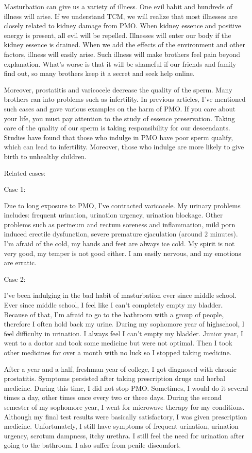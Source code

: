 \documentclass[
]{book}
\begin{document}
Masturbation can give us a variety of illness. One evil habit and hundreds of illness will arise. If we understand TCM, we will realize that most illnesses are closely related to kidney damage from PMO. When kidney essence and positive energy is present, all evil will be repelled. Illnesses will enter our body if the kidney essence is drained. When we add the effects of the environment and other factors, illness will easily arise. Such illness will make brothers feel pain beyond explanation. What's worse is that it will be shameful if our friends and family find out, so many brothers keep it a secret and seek help online.

Moreover, prostatitis and varicocele decrease the quality of the sperm. Many brothers ran into problems such as infertility. In previous articles, I've mentioned such cases and gave various examples on the harm of PMO. If you care about your life, you must pay attention to the study of essence preservation. Taking care of the quality of our sperm is taking responsibility for our descendants. Studies have found that those who indulge in PMO have poor sperm qualify, which can lead to infertility. Moreover, those who indulge are more likely to give birth to unhealthy children.

Related cases:

Case 1:

Due to long exposure to PMO, I've contracted varicocele. My urinary problems includes: frequent urination, urination urgency, urination blockage. Other problems such as perineum and rectum soreness and inflammation, mild porn induced erectile dysfunction, severe premature ejaculation (around 2 minutes). I'm afraid of the cold, my hands and feet are always ice cold. My spirit is not very good, my temper is not good either. I am easily nervous, and my emotions are erratic.

Case 2:

I've been indulging in the bad habit of masturbation ever since middle school. Ever since middle school, I feel like I can't completely empty my bladder. Because of that, I'm afraid to go to the bathroom with a group of people, therefore I often hold back my urine. During my sophomore year of highschool, I feel difficulty in urination. I always feel I can't empty my bladder. Junior year, I went to a doctor and took some medicine but were not optimal. Then I took other medicines for over a month with no luck so I stopped taking medicine.

After a year and a half, freshman year of college, I got diagnosed with chronic prostatitis. Symptoms persisted after taking prescription drugs and herbal medicine. During this time, I did not stop PMO. Sometimes, I would do it several times a day, other times once every two or three days. During the second semester of my sophomore year, I went for microwave therapy for my conditions. Although my final test results were basically satisfactory, I was given prescription medicine. Unfortunately, I still have symptoms of frequent urination, urination urgency, scrotum dampness, itchy urethra. I still feel the need for urination after going to the bathroom. I also suffer from penile discomfort.
\end{document}
